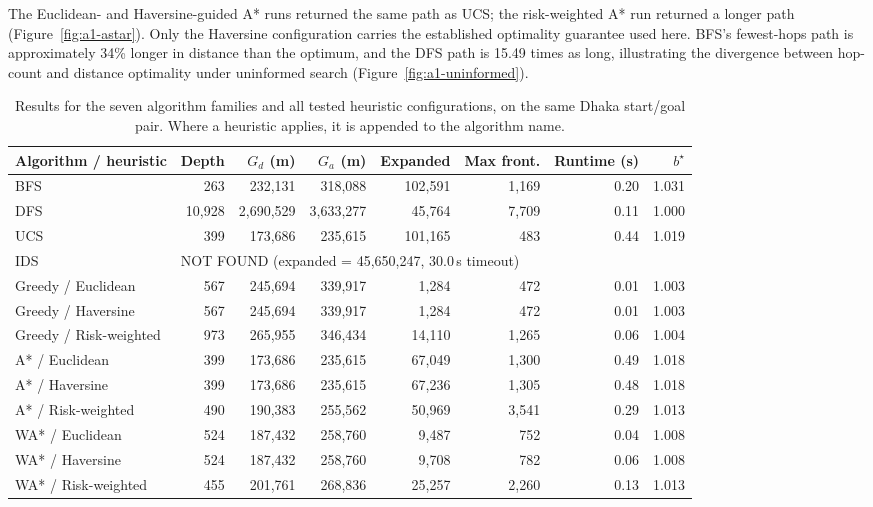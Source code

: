 \documentclass{ai-lab-report}
\begin{document}
The Euclidean- and Haversine-guided A* runs returned the same path as UCS; the risk-weighted A* run returned a longer path (Figure~\ref{fig:a1-astar}). Only the Haversine configuration carries the established optimality guarantee used here. BFS's fewest-hops path is approximately 34\% longer in distance than the optimum, and the DFS path is 15.49 times as long, illustrating the divergence between hop-count and distance optimality under uninformed search (Figure~\ref{fig:a1-uninformed}).
\begin{table}[H]
\centering
\small
\caption{Results for the seven algorithm families and all tested heuristic configurations, on the same Dhaka start/goal pair. Where a heuristic applies, it is appended to the algorithm name.}
\label{tab:a1-all}
\begin{tabular}{lrrrrrrr}
\toprule
Algorithm / heuristic & Depth & $G_d$ (m) & $G_a$ (m) & Expanded & Max front. & Runtime (s) & $b^\star$ \\
\midrule
BFS & 263 & 232{,}131 & 318{,}088 & 102{,}591 & 1{,}169 & 0.20 & 1.031 \\
DFS & 10{,}928 & 2{,}690{,}529 & 3{,}633{,}277 & 45{,}764 & 7{,}709 & 0.11 & 1.000 \\
UCS & 399 & 173{,}686 & 235{,}615 & 101{,}165 & 483 & 0.44 & 1.019 \\
IDS & \multicolumn{7}{l}{\small NOT FOUND (expanded = 45{,}650{,}247, 30.0\,s timeout)} \\
Greedy / Euclidean & 567 & 245{,}694 & 339{,}917 & 1{,}284 & 472 & 0.01 & 1.003 \\
Greedy / Haversine & 567 & 245{,}694 & 339{,}917 & 1{,}284 & 472 & 0.01 & 1.003 \\
Greedy / Risk-weighted & 973 & 265{,}955 & 346{,}434 & 14{,}110 & 1{,}265 & 0.06 & 1.004 \\
A* / Euclidean & 399 & 173{,}686 & 235{,}615 & 67{,}049 & 1{,}300 & 0.49 & 1.018 \\
A* / Haversine & 399 & 173{,}686 & 235{,}615 & 67{,}236 & 1{,}305 & 0.48 & 1.018 \\
A* / Risk-weighted & 490 & 190{,}383 & 255{,}562 & 50{,}969 & 3{,}541 & 0.29 & 1.013 \\
WA* / Euclidean & 524 & 187{,}432 & 258{,}760 & 9{,}487 & 752 & 0.04 & 1.008 \\
WA* / Haversine & 524 & 187{,}432 & 258{,}760 & 9{,}708 & 782 & 0.06 & 1.008 \\
WA* / Risk-weighted & 455 & 201{,}761 & 268{,}836 & 25{,}257 & 2{,}260 & 0.13 & 1.013 \\
\bottomrule
\end{tabular}
\end{table}
\end{document}
